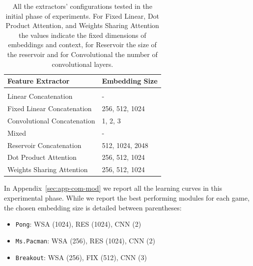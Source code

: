 
\begin{table}[ht]
    \begin{center}
        \begin{tabular}{ll}
            \multicolumn{1}{l}{\bf Feature Extractor}  &\multicolumn{1}{l}{\bf Embedding Size}
            \\ \hline \\
            Linear Concatenation              &  - \\
            Fixed Linear Concatenation        & 256, 512, 1024 \\
            Convolutional Concatenation       & 1, 2, 3\\
            Mixed                             & - \\
            Reservoir Concatenation           & 512, 1024, 2048 \\
            Dot Product Attention             & 256, 512, 1024 \\
            Weights Sharing Attention         & 256, 512, 1024 \\

        \end{tabular}
    \end{center}
    \caption{All the extractors' configurations tested in the initial phase of experiments. For Fixed Linear, Dot Product Attention, and Weights Sharing Attention the values indicate the fixed dimensions of embeddings and context, for Reservoir the size of the reservoir and for Convolutional the number of convolutional layers.}
    \label{tab:emb_siz_modules}
\end{table}



In Appendix~\ref{sec:app-com-mod} we report all the learning curves in this experimental phase.
While we report the best performing modules for each game, the chosen embedding size is detailed between parentheses:
\begin{itemize}
    \item \texttt{Pong}: WSA (1024), RES (1024), CNN (2)
    \item \texttt{Ms.Pacman}: WSA (256), RES (1024), CNN (2)
    \item \texttt{Breakout}: WSA (256), FIX (512), CNN (3)
\end{itemize}





